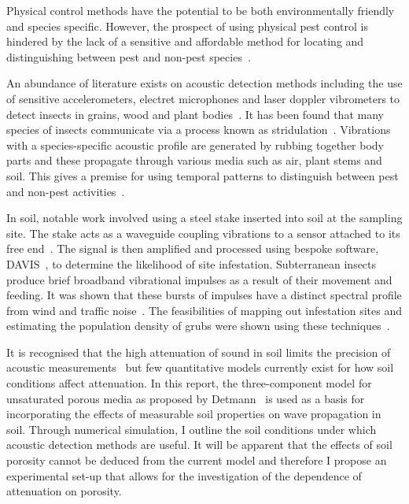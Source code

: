 \documentclass[twocolumn]{article}
\begin{document}
Physical control methods have the potential to be both environmentally friendly and species specific. However, the prospect of using physical pest control is hindered by the lack of a sensitive and affordable method for locating and distinguishing between pest and non-pest species~\cite{vincent_hallman_panneton_2003}.

An abundance of literature exists on acoustic detection methods including the use of sensitive accelerometers, electret microphones and laser doppler vibrometers to detect insects in grains, wood and plant bodies~\cite{mankin_hagstrum_kairo_2011, michelsen_fink_gogala_traue_1982, johnson_crawford_zhang_2007}. It has been found that many species of insects communicate via a process known as stridulation~\cite{gorres_chesmore_2019}. Vibrations with a species-specific acoustic profile are generated by rubbing together body parts and these propagate through various media such as air, plant stems and soil. This gives a premise for using temporal patterns to distinguish between pest and non-pest activities~\cite{mankin_mccoy_shapiro_1998}.

In soil, notable work involved using a steel stake inserted into soil at the sampling site. The stake acts as a waveguide coupling vibrations to a sensor attached to its free end~\cite{inyang_mankin_2019}. The signal is then amplified and processed using bespoke software, DAVIS~\cite{mankin_hubbard_weaver_2000}, to determine the likelihood of site infestation. Subterranean insects produce brief broadband vibrational impulses as a result of their movement and feeding. It was shown that these bursts of impulses have a distinct spectral profile from wind and traffic noise~\cite{sanders_mankin_liburd_stelinski_2011}. The feasibilities of mapping out infestation sites and estimating the population density of grubs were shown using these techniques~\cite{hubbard_mankin_crocker_2001, mankin_hubbard_flanders_2007}.

It is recognised that the high attenuation of sound in soil limits the precision of acoustic measurements~\cite{mankin_mccoy_shapiro_1998} but few quantitative models currently exist for how soil conditions affect attenuation. In this report, the three-component model for unsaturated porous media as proposed by Detmann~\cite{detmann_num_sim_2008} is used as a basis for incorporating the effects of measurable soil properties on wave propagation in soil. Through numerical simulation, I outline the soil conditions under which acoustic detection methods are useful. It will be apparent that the effects of soil porosity cannot be deduced from the current model and therefore I propose an experimental set-up that allows for the investigation of the dependence of attenuation on porosity.
\end{document}
